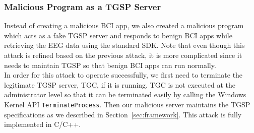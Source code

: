 \subsubsection{Malicious Program as a TGSP Server}\label{sec:malicious:TGSP}
Instead of creating a malicious BCI app, we also created a malicious program which acts as a fake TGSP server and responds to benign BCI apps while retrieving the EEG data using the standard SDK. Note that even though this attack is refined based on the previous attack, it is more complicated since it needs to maintain TGSP so that benign BCI apps can run normally.\\
\indent In order for this attack to operate successfully, we first need to terminate the legitimate TGSP server, TGC, if it is running. TGC is not executed at the administrator level so that it can be terminated easily by calling the Windows Kernel API \texttt{TerminateProcess}. Then our malicious server maintains the TGSP specifications as we described in Section~\ref{sec:framework}. This attack is fully implemented in C/C++.


